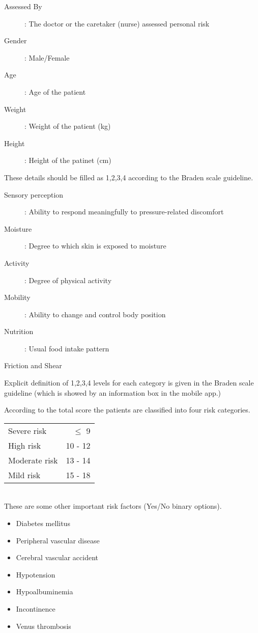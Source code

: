 \begin{description}
	\item[Assessed By]: The doctor or the caretaker (nurse) assessed personal risk
	\item[Gender]: Male/Female
	\item[Age]: Age of the patient
	\item[Weight]: Weight of the patient (kg)
	\item[Height]: Height of the patinet (cm)    
\end{description}

These details should be filled as 1,2,3,4 according to the Braden scale guideline. 

\begin{description}
	\item[Sensory perception]: Ability to respond meaningfully to pressure-related discomfort 
	\item[Moisture]: Degree to which skin is exposed to moisture 
	\item[Activity]: Degree of physical	activity 
	\item[Mobility]: Ability to change and control body position
	\item[Nutrition]: Usual food intake 	pattern 
	\item[Friction and Shear]     
\end{description}

Explicit definition of 1,2,3,4 levels for each category is given in the Braden scale guideline (which is showed by an information box in the mobile app.)

According to the total score the patients are classified into four risk categories.


\begin{tabular}{l r}
	Severe risk &  $\leq$ 9\\
	High risk &  10 - 12\\
	Moderate risk & 13 - 14\\
	Mild risk &  15 - 18 \\
\end{tabular}\\

These are some other important risk factors (Yes/No binary options). 

\begin{itemize}
	\item Diabetes mellitus
	\item Peripheral vascular disease
	\item Cerebral vascular accident
	\item Hypotension
	\item Hypoalbuminemia
	\item Incontinence
	\item Venus thrombosis	
\end{itemize}


